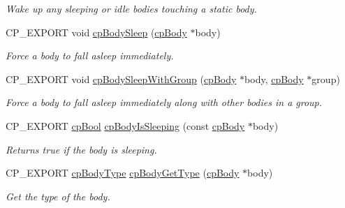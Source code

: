 \begin{DoxyCompactItemize}
\begin{DoxyCompactList}\small\item\em Wake up any sleeping or idle bodies touching a static body. \end{DoxyCompactList}\item 
\mbox{\label{group__cpBody_gad19cfc0a8e8a96fedf723b165d32a108}} 
C\+P\+\_\+\+E\+X\+P\+O\+RT void \hyperlink{group__cpBody_gad19cfc0a8e8a96fedf723b165d32a108}{cp\+Body\+Sleep} (\hyperlink{structcpBody}{cp\+Body} $\ast$body)
\begin{DoxyCompactList}\small\item\em Force a body to fall asleep immediately. \end{DoxyCompactList}\item 
\mbox{\label{group__cpBody_gaae5b2ea3123f996b4db92e63e5f55513}} 
C\+P\+\_\+\+E\+X\+P\+O\+RT void \hyperlink{group__cpBody_gaae5b2ea3123f996b4db92e63e5f55513}{cp\+Body\+Sleep\+With\+Group} (\hyperlink{structcpBody}{cp\+Body} $\ast$body, \hyperlink{structcpBody}{cp\+Body} $\ast$group)
\begin{DoxyCompactList}\small\item\em Force a body to fall asleep immediately along with other bodies in a group. \end{DoxyCompactList}\item 
\mbox{\label{group__cpBody_ga1bbf47da33d1a2260866f2a257e1b4fa}} 
C\+P\+\_\+\+E\+X\+P\+O\+RT \hyperlink{group__basicTypes_gabc5e752c48f3449ca26ef413ecbd647e}{cp\+Bool} \hyperlink{group__cpBody_ga1bbf47da33d1a2260866f2a257e1b4fa}{cp\+Body\+Is\+Sleeping} (const \hyperlink{structcpBody}{cp\+Body} $\ast$body)
\begin{DoxyCompactList}\small\item\em Returns true if the body is sleeping. \end{DoxyCompactList}\item 
\mbox{\label{group__cpBody_gab29fcc05a72380a8ae4cb09af6def230}} 
C\+P\+\_\+\+E\+X\+P\+O\+RT \hyperlink{group__cpBody_ga3581b128fd3e2734952aeac8545fd5ca}{cp\+Body\+Type} \hyperlink{group__cpBody_gab29fcc05a72380a8ae4cb09af6def230}{cp\+Body\+Get\+Type} (\hyperlink{structcpBody}{cp\+Body} $\ast$body)
\begin{DoxyCompactList}\small\item\em Get the type of the body. \end{DoxyCompactList}\item 

\end{DoxyCompactItemize}
